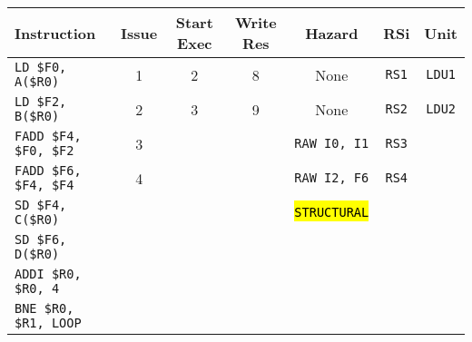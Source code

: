 \begin{enumerate}
    \begin{table}[!htp]
        \centering
        \begin{adjustbox}{width={\textwidth},totalheight={\textheight},keepaspectratio}
        \begin{tabular}{@{} l c c c c c c @{}}
            \toprule
            \textbf{Instruction} & \textbf{Issue} & \textbf{Start Exec} & \textbf{Write Res} & \textbf{Hazard} & \textbf{RSi} & \textbf{Unit} \\
            \midrule
            \texttt{LD \$F0, A(\$R0)}       & 1 & 2 & 8 & None  & \texttt{RS1}   & \texttt{LDU1}  \\ [.5em]
            \texttt{LD \$F2, B(\$R0)}       & 2 & 3 & 9 & None  & \texttt{RS2}   & \texttt{LDU2}  \\ [.5em]
            \texttt{FADD \$F4, \$F0, \$F2}  & 3 &   &   & \texttt{RAW I0, I1} & \texttt{RS3} &       \\ [.5em]
            \texttt{FADD \$F6, \$F4, \$F4}  & 4 &   &   & \texttt{RAW I2, F6} & \texttt{RS4} &       \\ [.5em]
            \texttt{SD \$F4, C(\$R0)}       &   &   &   & \hl{\texttt{STRUCTURAL}} &       &       \\ [.5em]
            \texttt{SD \$F6, D(\$R0)}       &   &   &   &       &       &       \\ [.5em]
            \texttt{ADDI \$R0, \$R0, 4}     &   &   &   &       &       &       \\ [.5em]
            \texttt{BNE \$R0, \$R1, LOOP}   &   &   &   &       &       &       \\
            \bottomrule
        \end{tabular}
        \end{adjustbox}
    \end{table}
    

\end{enumerate}
